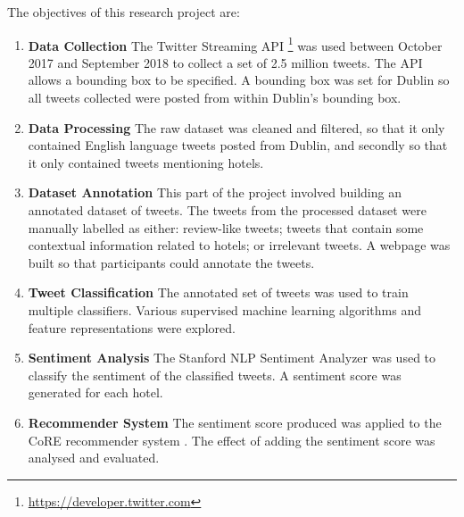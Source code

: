 The objectives of this research project are:
\begin{enumerate}
    \item \textbf{Data Collection}\newline
    The Twitter Streaming API \footnote{\url{https://developer.twitter.com}} was used between October 2017 and September 2018 to collect a set of 2.5 million tweets. The API allows a bounding box to be specified. A bounding box was set for Dublin so all tweets collected were posted from within Dublin's bounding box.
    \item \textbf{Data Processing}\newline
    The raw dataset was cleaned and filtered, so that it only contained English language tweets posted from Dublin, and secondly so that it only contained tweets mentioning hotels.
    \item \textbf{Dataset Annotation} \newline
    This part of the project involved building an annotated dataset of tweets. The tweets from the processed dataset were manually labelled as either: review-like tweets; tweets that contain some contextual information related to hotels; or irrelevant tweets. A webpage was built so that participants could annotate the tweets.
    \item \textbf{Tweet Classification}\newline
    The annotated set of tweets was used to train multiple classifiers. Various supervised machine learning algorithms and feature representations were explored.
    \item \textbf{Sentiment Analysis}\newline
    The Stanford NLP Sentiment Analyzer \cite{stanfordSentiment2013} was used to classify the sentiment of the classified tweets. A sentiment score was generated for each hotel.
    \item \textbf{Recommender System}\newline
    The sentiment score produced was applied to the CoRE recommender system \cite{core2019}. The effect of adding the sentiment score was analysed and evaluated.
\end{enumerate}

